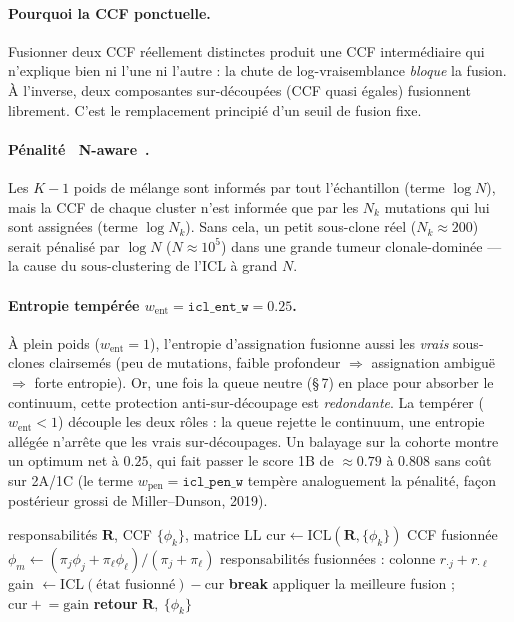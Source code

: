 \documentclass[11pt,a4paper]{article}
\providecommand{\og}{\guillemotleft~}
\providecommand{\fg}{~\guillemotright}
\newcommand{\code}[1]{\texttt{#1}}
\newcommand{\Rmat}{\mathbf{R}}
\theoremstyle{remark}
\begin{document}
\paragraph{Pourquoi la CCF ponctuelle.} Fusionner deux CCF réellement distinctes produit une
CCF intermédiaire qui n'explique bien ni l'une ni l'autre : la chute de log-vraisemblance
\emph{bloque} la fusion. À l'inverse, deux composantes sur-découpées (CCF quasi égales)
fusionnent librement. C'est le remplacement principié d'un seuil de fusion fixe.

\paragraph{Pénalité \og{}N-aware\fg{}.} Les $K-1$ poids de mélange sont informés par tout
l'échantillon (terme $\log N$), mais la CCF de chaque cluster n'est informée que par les
$N_k$ mutations qui lui sont assignées (terme $\log N_k$). Sans cela, un petit sous-clone
réel ($N_k\approx 200$) serait pénalisé par $\log N$ ($N\approx 10^5$) dans une grande tumeur
clonale-dominée --- la cause du sous-clustering de l'ICL à grand $N$.

\paragraph{Entropie tempérée $w_{\mathrm{ent}}=\code{icl\_ent\_w}=0.25$.} À plein poids
($w_{\mathrm{ent}}=1$), l'entropie d'assignation fusionne aussi les \emph{vrais} sous-clones
clairsemés (peu de mutations, faible profondeur $\Rightarrow$ assignation ambiguë $\Rightarrow$
forte entropie). Or, une fois la queue neutre (\S\,7) en place pour absorber le continuum,
cette protection anti-sur-découpage est \emph{redondante}. La tempérer ($w_{\mathrm{ent}}<1$)
découple les deux rôles : la queue rejette le continuum, une entropie allégée n'arrête que
les vrais sur-découpages. Un balayage sur la cohorte montre un optimum net à $0.25$, qui
fait passer le score 1B de $\approx 0.79$ à $\mathbf{0.808}$ sans coût sur 2A/1C
(le terme $w_{\mathrm{pen}}=\code{icl\_pen\_w}$ tempère analoguement la pénalité, façon
postérieur grossi de Miller--Dunson, 2019).

\begin{algorithm}[t]
\caption{Fusion agglomérative guidée par l'ICL (\code{\_icl\_merge})}
\label{alg:icl}
\begin{algorithmic}[1]
\REQUIRE responsabilités $\Rmat$, CCF $\{\phi_k\}$, matrice $\mathrm{LL}$
\STATE $\mathrm{cur}\gets\mathrm{ICL}(\Rmat,\{\phi_k\})$ \COMMENT{\eqref{eq:icl}}
    \STATE CCF fusionnée $\phi_m\gets(\pi_j\phi_j+\pi_\ell\phi_\ell)/(\pi_j+\pi_\ell)$
    \STATE responsabilités fusionnées : colonne $r_{\cdot j}+r_{\cdot\ell}$
    \STATE gain $\gets \mathrm{ICL}(\text{état fusionné})-\mathrm{cur}$
  \ENDFOR
    \STATE \textbf{break}
  \ENDIF
  \STATE appliquer la meilleure fusion ; $\mathrm{cur}\mathrel{+}=\text{gain}$
\ENDWHILE
\STATE \textbf{retour} $\Rmat,\ \{\phi_k\}$
\end{algorithmic}
\end{algorithm}
\end{document}
